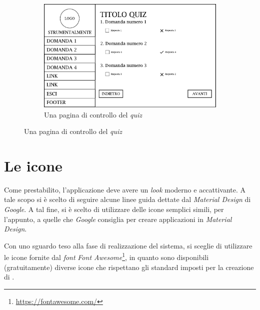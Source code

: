 \begin{figure}[H]\ContinuedFloat
	\begin{subfigure}[t]{\textwidth}
		\centering
		\includegraphics[width=\textwidth]{gabbie_logiche/Controlla_Quiz}
		\caption{Una pagina di controllo del \emph{quiz}}
	\end{subfigure}
\end{figure}

\section{Le icone}

Come prestabilito, l'applicazione deve avere un \emph{look} moderno e
accattivante. A tale scopo si è scelto di seguire alcune linee guida dettate dal
\emph{Material Design} di \emph{Google}. A tal fine, si è scelto di utilizzare
delle icone semplici simili, per l'appunto, a quelle che \emph{Google} consiglia
per creare applicazioni in \emph{Material Design}. 

Con uno sguardo teso alla fase di realizzazione del sistema, si sceglie di
utilizzare le icone fornite dal \emph{font} \emph{Font
Awesome}\footnote{\url{https://fontawesome.com/}}, in quanto sono disponibili
(gratuitamente) diverse icone che rispettano gli standard imposti per la
creazione di \ProjectTitle{}.